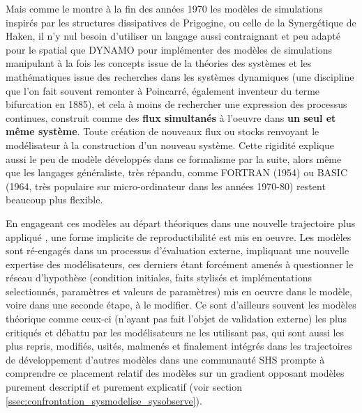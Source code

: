 Mais comme le montre à la fin des années 1970 les modèles de simulations inspirés par les structures dissipatives de Prigogine, ou celle de la Synergétique de Haken, il n'y nul besoin d'utiliser un langage aussi contraignant et peu adapté pour le spatial que DYNAMO pour implémenter des modèles de simulations manipulant à la fois les concepts issue de la théories des systèmes et les mathématiques issue des recherches dans les systèmes dynamiques (une discipline que l'on fait souvent remonter à Poincarré, également inventeur du terme bifurcation en 1885), et cela à moins de rechercher une expression des processus continues, construit comme des \textbf{flux simultanés} à l'oeuvre dans \textbf{un seul et même système}. Toute création de nouveaux flux ou stocks renvoyant le modélisateur à la construction d'un nouveau système. Cette rigidité explique aussi le peu de modèle développés dans ce formalisme par la suite, alors même que les langages généraliste, très répandu, comme FORTRAN (1954) ou BASIC (1964, très populaire sur micro-ordinateur dans les années 1970-80) restent beaucoup plus flexible. %

En engageant ces modèles au départ théoriques dans une nouvelle trajectoire plus appliqué \autocite{Banos2013a}, une forme implicite de reproductibilité est mis en oeuvre. Les modèles sont ré-engagés dans un processus d'évaluation externe, impliquant une nouvelle expertise des modélisateurs, ces derniers étant forcément amenés à questionner le réseau d'hypothèse (condition initiales, faits stylisés et implémentations selectionnés, paramètres et valeurs de paramètres) mis en oeuvre dans le modèle, voire dans une seconde étape, à le modifier. Ce sont d'ailleurs souvent les modèles théorique comme ceux-ci (n'ayant pas fait l'objet de validation externe) les plus critiqués et débattu par les modélisateurs ne les utilisant pas, qui sont aussi les plus repris, modifiés, usités, malmenés et finalement intégrés dans les trajectoires de développement d'autres modèles dans une communauté SHS prompte à comprendre ce placement relatif des modèles sur un gradient opposant modèles purement descriptif et purement explicatif \autocites{Bulle2005, Rouchier2013} (voir section \ref{ssec:confrontation_sysmodelise_sysobserve}).  %


